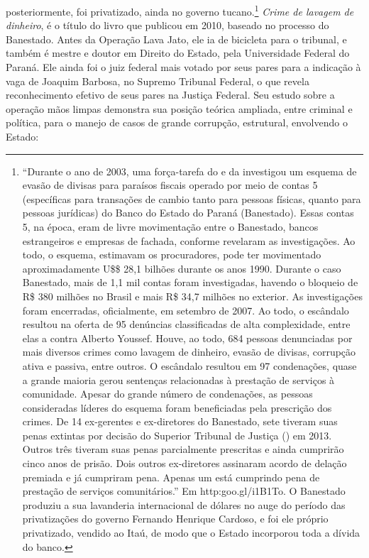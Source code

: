 posteriormente, foi privatizado, ainda no governo tucano.\footnote{``Durante
  o ano de 2003, uma força-tarefa do  e da  investigou um esquema
  de evasão de divisas para paraísos fiscais operado por meio de contas
  5 (específicas para transações de cambio tanto para pessoas físicas,
  quanto para pessoas jurídicas) do Banco do Estado do Paraná
  (Banestado). Essas contas 5, na época, eram de livre movimentação
  entre o Banestado, bancos estrangeiros e empresas de fachada, conforme
  revelaram as investigações. Ao todo, o esquema, estimavam os
  procuradores, pode ter movimentado aproximadamente U\$\$ 28,1 bilhões
  durante os anos 1990. Durante o caso Banestado, mais de 1,1 mil contas
  foram investigadas, havendo o bloqueio de R\$ 380 milhões no Brasil e
  mais R\$ 34,7 milhões no exterior. As investigações foram encerradas,
  oficialmente, em setembro de 2007. Ao todo, o escândalo resultou na
  oferta de 95 denúncias classificadas de alta complexidade, entre elas
  a contra Alberto Youssef. Houve, ao todo, 684 pessoas denunciadas por
  mais diversos crimes como lavagem de dinheiro, evasão de divisas,
  corrupção ativa e passiva, entre outros. O escândalo resultou em 97
  condenações, quase a grande maioria gerou sentenças relacionadas à
  prestação de serviços à comunidade. Apesar do grande número de
  condenações, as pessoas consideradas líderes do esquema foram
  beneficiadas pela prescrição dos crimes. De 14 ex-gerentes e
  ex-diretores do Banestado, sete tiveram suas penas extintas por
  decisão do Superior Tribunal de Justiça () em 2013. Outros três
  tiveram suas penas parcialmente prescritas e ainda cumprirão cinco
  anos de prisão. Dois outros ex-diretores assinaram acordo de delação
  premiada e já cumpriram pena. Apenas um está cumprindo pena de
  prestação de serviços comunitários.'' Em
  http:goo.gl/i1B1To.
  O Banestado produziu a sua lavanderia internacional de dólares no auge
  do período das privatizações do governo Fernando Henrique Cardoso, e
  foi ele próprio privatizado, vendido ao Itaú, de modo que o Estado
  incorporou toda a dívida do banco.} \emph{Crime de lavagem de
dinheiro}, é o título do livro que publicou em 2010, baseado no processo
do Banestado. Antes da Operação Lava Jato, ele ia de bicicleta para o
tribunal, e também é mestre e doutor em Direito do Estado, pela
Universidade Federal do Paraná. Ele ainda foi o juiz federal mais votado
por seus pares para a indicação à vaga de Joaquim Barbosa, no Supremo
Tribunal Federal, o que revela reconhecimento efetivo de seus pares na
Justiça Federal. Seu estudo sobre a operação mãos limpas demonstra sua
posição teórica ampliada, entre criminal e política, para o manejo de
casos de grande corrupção, estrutural, envolvendo o Estado:

